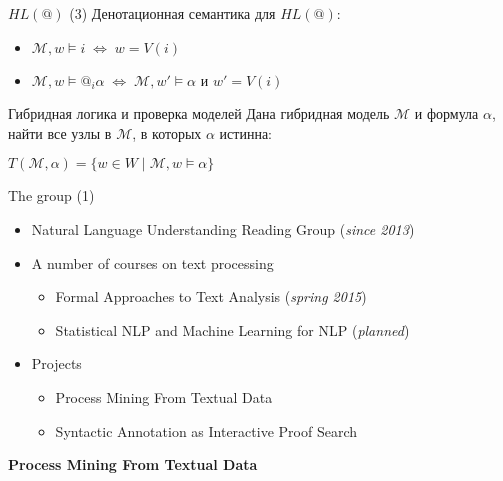 \documentclass{beamer}
\begin{document}
\begin{frame}{$HL(@)$ (3)}
Денотационная семантика для $HL(@)$:\\
\bigskip
\begin{itemize}
	\item $\mathcal{M}, w \models i \; \Leftrightarrow \; w = V(i)$
	\item $\mathcal{M}, w \models @_i \alpha \; \Leftrightarrow \; \mathcal{M}, w' \models \alpha$ и $w' = V(i)$
\end{itemize}
\end{frame}


\begin{frame}{Гибридная логика и проверка моделей}
Дана гибридная модель $\mathcal{M}$ и формула $\alpha$, найти все узлы в $\mathcal{M}$, в которых $\alpha$ истинна:
\bigskip
\begin{center}
    $T(\mathcal{M}, \alpha) = \{ w \in W \; | \; \mathcal{M}, w \models \alpha \}$
\end{center}
\end{frame}


\begin{frame}{The group (1)}
\begin{itemize}
    \item Natural Language Understanding Reading Group (\textit{since 2013})
    \item A number of courses on text processing
        \begin{itemize}
            \item Formal Approaches to Text Analysis (\textit{spring 2015})
            \item Statistical NLP and Machine Learning for NLP (\textit{planned})
        \end{itemize}
    \item Projects
        \begin{itemize}
            \item Process Mining From Textual Data
            \item Syntactic Annotation as Interactive Proof Search
        \end{itemize}
\end{itemize}
\end{frame}

\begin{frame}{}
\begin{center}
	\textbf{Process Mining From Textual Data}
\end{center}
\end{frame}
\end{document}
